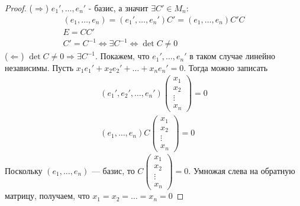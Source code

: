 \documentclass[a4paper,12pt]{article}
\begin{document}
\begin{proof}
($\Rightarrow$) $e_1', \ldots, e_n'$ - базис, а значит $\exists C' \in M_n \colon$
\begin{gather*}
\left(e_1, \ldots, e_n\right) = \left(e_1', \ldots, e_n'\right)C' = \left(e_1, \ldots, e_n\right)C'C\\
E = CC'\\
C' = C^{-1} \Leftrightarrow \exists C^{-1} \Leftrightarrow \det{C} \neq 0
\end{gather*}
($\Leftarrow$) $\det C \neq 0 \Rightarrow \exists C^{-1}$. Покажем, что $e_1', \ldots, e_n'$ в таком случае линейно независимы. Пусть $x_1e_1' + x_2e_2' + \ldots + x_ne_n' = 0$. Тогда можно записать
\begin{gather*}
\left(e_1', e_2', \ldots, e_n'\right) 
\begin{pmatrix}
    x_1\\
    x_2\\
    \vdots\\
    x_n
\end{pmatrix} = 0\\
\left(e_1, \ldots, e_n\right)C\begin{pmatrix}
    x_1\\
    x_2\\
    \vdots\\
    x_n
\end{pmatrix} = 0
\end{gather*}
Поскольку $\left(e_1, \ldots, e_n\right)$ --- базис, то $C \begin{pmatrix}
    x_1\\
    x_2\\
    \vdots\\
    x_n
\end{pmatrix} = 0$. Умножая слева на обратную матрицу, получаем, что $x_1 = x_2 = \ldots = x_n = 0$
\end{proof}
\end{document}
